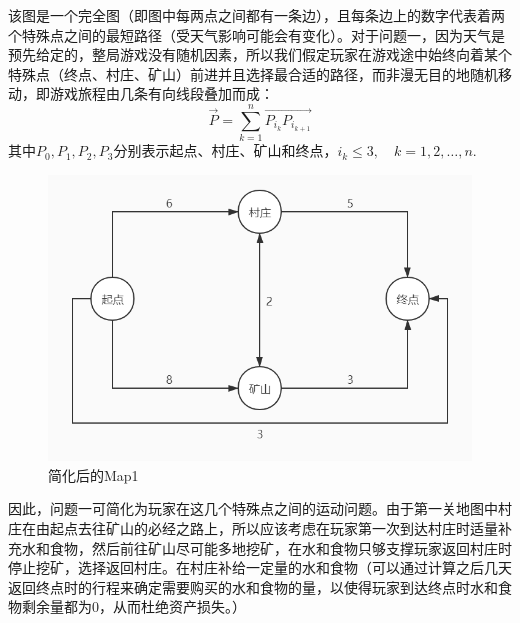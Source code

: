 \documentclass[withoutpre]{cumcmthesis} %
\begin{document}
该图是一个完全图（即图中每两点之间都有一条边），且每条边上的数字代表着两个特殊点之间的最短路径（受天气影响可能会有变化）。对于问题一，因为天气是预先给定的，整局游戏没有随机因素，所以我们假定玩家在游戏途中始终向着某个特殊点（终点、村庄、矿山）前进并且选择最合适的路径，而非漫无目的地随机移动，即游戏旅程由几条有向线段叠加而成：
\begin{equation}
	\overrightarrow{P}=\sum_{k=1}^{n}\overrightarrow{P_{i_k}P_{i_{k+1}}}
\end{equation}
其中$P_0,P_1,P_2,P_3$分别表示起点、村庄、矿山和终点，$i_k\leqslant3,\quad k=1,2,\dots,n$.
\begin{figure}[H]
	\centering
	\includegraphics[scale=0.4]{figures/map1newer.jpg}
	\caption{简化后的Map1}
	\label{fig:map1}
\end{figure}
因此，问题一可简化为玩家在这几个特殊点之间的运动问题。由于第一关地图中村庄在由起点去往矿山的必经之路上，所以应该考虑在玩家第一次到达村庄时适量补充水和食物，然后前往矿山尽可能多地挖矿，在水和食物只够支撑玩家返回村庄时停止挖矿，选择返回村庄。在村庄补给一定量的水和食物（可以通过计算之后几天返回终点时的行程来确定需要购买的水和食物的量，以使得玩家到达终点时水和食物剩余量都为0，从而杜绝资产损失。）
\end{document}
